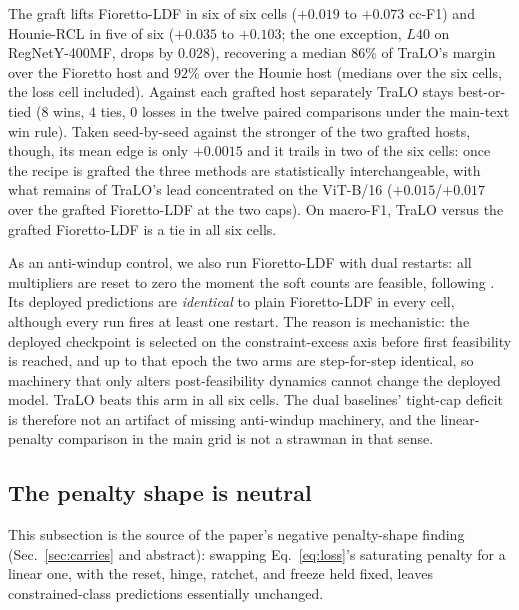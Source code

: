 \documentclass[10pt]{article}
\begin{document}
The graft lifts Fioretto-LDF in six of six cells ($+0.019$ to $+0.073$
cc-F1) and Hounie-RCL in five of six ($+0.035$ to $+0.103$; the one
exception, $L40$ on RegNet{Y-400MF}, drops by $0.028$), recovering a median
$86\%$ of TraLO's margin over the Fioretto host and $92\%$ over the
Hounie host (medians over the six cells, the loss cell included).
Against each grafted host separately TraLO stays best-or-tied ($8$
wins, $4$ ties, $0$ losses in the twelve paired comparisons under the
main-text win rule). Taken seed-by-seed against the stronger of the two
grafted hosts, though, its mean edge is only $+0.0015$ and it trails in
two of the six cells: once the recipe is grafted the three methods are
statistically interchangeable, with what remains of TraLO's lead
concentrated on the ViT-B/16 ($+0.015$/$+0.017$ over the grafted
Fioretto-LDF at the two caps). On macro-F1, TraLO versus the grafted
Fioretto-LDF is a tie in all six cells.

As an anti-windup control, we also run Fioretto-LDF with dual restarts:
all multipliers are reset to zero the moment the soft counts are
feasible, following \citet{gallego2022controlled}. Its deployed
predictions are \emph{identical} to plain Fioretto-LDF in every cell,
although every run fires at least one restart. The reason is
mechanistic: the deployed checkpoint is selected on the
constraint-excess axis before first feasibility is reached, and up to
that epoch the two arms are step-for-step identical, so machinery that
only alters post-feasibility dynamics cannot change the deployed model.
TraLO beats this arm in all six cells. The dual baselines' tight-cap
deficit is therefore not an artifact of missing anti-windup machinery,
and the linear-penalty comparison in the main grid is not a strawman in
that sense.

\subsection{The penalty shape is neutral}
\label{app:shape}

This subsection is the source of the paper's negative penalty-shape
finding (Sec.~\ref{sec:carries} and abstract): swapping
Eq.~\eqref{eq:loss}'s saturating penalty for a linear one, with the
reset, hinge, ratchet, and freeze held fixed, leaves constrained-class
predictions essentially unchanged.
\end{document}

